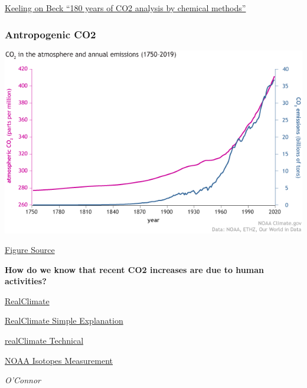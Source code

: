 \documentclass[
]{book}
\begin{document}
\href{https://www.jstor.org/stable/44397310?seq=1}{Keeling on Beck ``180 years of CO2 analysis by chemical methods''}

\hypertarget{antropogenic-co2}{%
\subsubsection{Antropogenic CO2}\label{antropogenic-co2}}

\includegraphics{fig/CO2_emissions_vs_concentrations_1751-2019.png}

\href{https://www.climate.gov/news-features/understanding-climate/climate-change-atmospheric-carbon-dioxide}{Figure Source}

\textbf{How do we know that recent CO2 increases are due to human activities?}

\href{https://www.realclimate.org/index.php/archives/2004/12/how-do-we-know-that-recent-cosub2sub-increases-are-due-to-human-activities-updated/}{RealClimate}

\href{https://www.realclimate.org/index.php/archives/2005/06/how-much-of-the-recent-cosub2sub-increase-is-due-to-human-activities/}{RealClimate Simple Explanation}

\href{https://www.realclimate.org/index.php/archives/2004/12/how-do-we-know-that-recent-co2-increases-are-due-to-human-activities/}{realClimate Technical}

\href{https://gml.noaa.gov/ccgg/isotopes/mixing.html}{NOAA Isotopes Measurement}

\emph{O'Connor}
\end{document}
